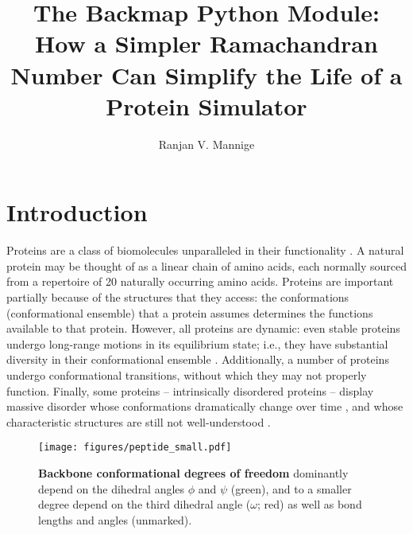 \documentclass[fleqn,10pt,lineno]{wlpeerj} %
\title{The Backmap Python Module: How a Simpler Ramachandran Number Can Simplify the Life of a Protein Simulator}
\author[*]{Ranjan V. Mannige}
\affil[*]{~ranjanmannige@gmail.com}
\begin{document}
\flushbottom
\maketitle
\thispagestyle{empty}

\section*{Introduction}

Proteins are a class of biomolecules unparalleled in their functionality \citep{Berg2006}. A natural protein may be thought of as a linear chain of amino acids, each normally sourced from a repertoire of 20 naturally occurring amino acids. 
Proteins are important partially because of the structures that they access: the conformations (conformational ensemble) that a protein assumes determines the functions available to that protein. However, all proteins are dynamic: even stable proteins undergo long-range motions in its equilibrium state; i.e., they have substantial diversity in their conformational ensemble \citep{Mannige2014b}. Additionally, a number of proteins undergo conformational transitions, without which they may not properly function. Finally, some proteins -- intrinsically disordered proteins -- display massive disorder whose conformations dramatically change over time \citep{Uversky2003, Fink2005, Midic2009, Espinoza-Fonseca2009, Uversky2010, Tompa2011, Sibille2012, Kosol2013, Dunker2013, Geist2013, Baruah2015}, and whose characteristic structures are still not well-understood \citep{Beck2008}.

\begin{figure}[b!]
\centering
\texttt{[image: figures/peptide\_small.pdf]}
\caption{\textbf{Backbone conformational degrees of freedom} dominantly depend on the dihedral angles $\phi$ and $\psi$ (green), and to a smaller degree depend on the third dihedral angle ($\omega$; red) as well as bond lengths and angles (unmarked). \label{fig:intro}} 
\end{figure}
\end{document}
